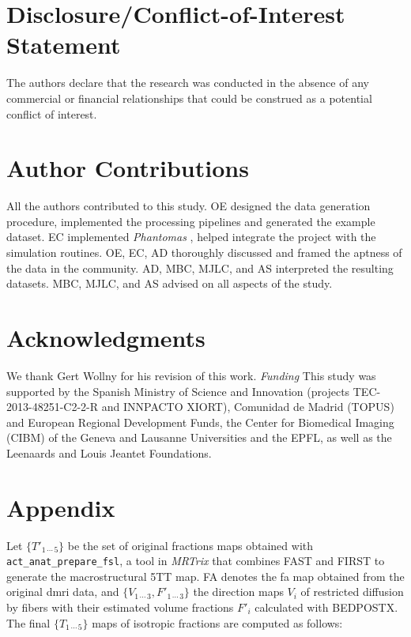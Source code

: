 \documentclass[english]{frontiers/frontiersSCNS} %
\begin{document}
\section*{Disclosure/Conflict-of-Interest Statement}

The authors declare that the research was conducted in the absence of any commercial or financial relationships that could be construed as a potential conflict of interest.

\section*{Author Contributions}
All the authors contributed to this study.
OE designed the data generation procedure, implemented the processing pipelines and generated the example dataset.
EC implemented \emph{Phantomas} \citep{caruyer_phantomas_2014}, helped integrate the project with the simulation routines.
OE, EC, AD thoroughly discussed and framed the aptness of the data in the community.
AD, MBC, MJLC, and AS interpreted the resulting datasets.
MBC, MJLC, and AS advised on all aspects of the study.


\section*{Acknowledgments}
We thank Gert Wollny for his revision of this work.
\textit{Funding\textcolon}
This study was supported by the Spanish Ministry of Science and Innovation
  (projects TEC-2013-48251-C2-2-R and INNPACTO XIORT), Comunidad de Madrid (TOPUS) and
  European Regional Development Funds, the Center for Biomedical Imaging
  (CIBM) of the Geneva and Lausanne Universities and the EPFL, as well as the
  Leenaards and Louis Jeantet Foundations.

\nolinenumbers




\glsresetall
\linenumbers
\section*{Appendix}\label{sec:appendix}
Let $\{T'_{1\,\cdots\,5}\}$ be the set of original fractions maps obtained with \texttt{act\_anat\_prepare\_fsl}, a
  tool in \emph{MRTrix} that combines FAST \citep{zhang_segmentation_2001} and FIRST \citep{patenaude_bayesian_2011}
  to generate the macrostructural 5TT map.
FA denotes the \gls*{fa} map obtained from the original \gls*{dmri} data, and $\{V_{1\,\cdots\,3}, F'_{1\,\cdots\,3}\}$ the direction
  maps $V_i$ of restricted diffusion by fibers with their estimated volume fractions $F'_i$ calculated with BEDPOSTX.
The final $\{T_{1\,\cdots\,5}\}$ maps of isotropic fractions are computed as follows:
\end{document}
